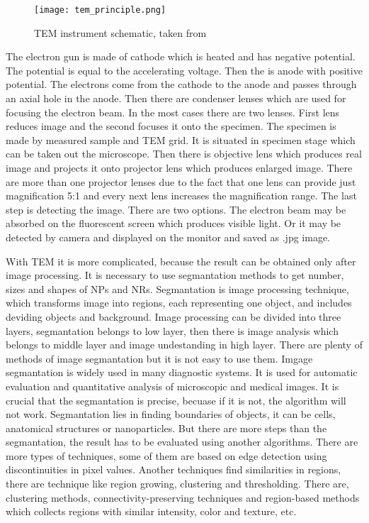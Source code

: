         \begin{figure}[h]
            \centerline{\texttt{[image: tem\_principle.png]}}
            \caption{TEM instrument schematic, taken from~\cite{20}}
            \label{fig:TEM}
        \end{figure}

        The electron gun is made of cathode which is heated and has negative potential. The potential is equal to the accelerating voltage. Then the is anode with positive potential.
        The electrons come from the cathode to the anode and passes through an axial hole in the anode. Then there are condenser lenses which are used for focusing the electron beam.
        In the most cases there are two lenses. First lens reduces image and the second focuses it onto the specimen. The specimen is made by measured sample and TEM grid.
        It is situated in specimen stage which can be taken out the microscope. Then there is objective lens which produces real image and projects it onto projector lens
        which produces enlarged image. There are more than one projector lenses due to the fact that one lens can provide just magnification 5:1
        and every next lens increases the magnification range. The last step is detecting the image. There are two options. The electron beam may be absorbed on the fluorescent screen
        which produces visible light. Or it may be detected by camera and displayed on the monitor and saved as .jpg image. \cite{7}

        With TEM it is more complicated, because the result can be obtained only after image processing. It is necessary to use segmantation methods to get number, sizes and shapes of
        NPs and NRs. Segmantation is image processing technique, which transforms image into regions, each representing one object, and includes deviding objects and background.
        Image processing can be divided into three layers, segmantation belongs to low layer, then there is image analysis which belongs to middle layer and image undestanding in high layer.
        There are plenty of methods of image segmantation but it is not easy to use them. Imgage segmantation is widely used in many diagnostic systems.
        It is used for automatic evaluation and quantitative analysis of microscopic and medical images. It is crucial that the segmantation is precise, becuase if it is not,
        the algorithm will not work. Segmantation lies in finding boundaries of objects, it can be cells, anatomical structures or nanoparticles.
        But there are more steps than the segmantation, the result has to be evaluated using another algorithms. There are more types of techniques, some of them are based on
        edge detection using discontinuities in pixel values. Another techniques find similarities in regions, there are technique like region growing, clustering and thresholding.
        There are, clustering methods, connectivity-preserving techniques and region-based methods which collects regions with similar intensity, color and texture, etc. \cite{1, 2, 15, 17}

